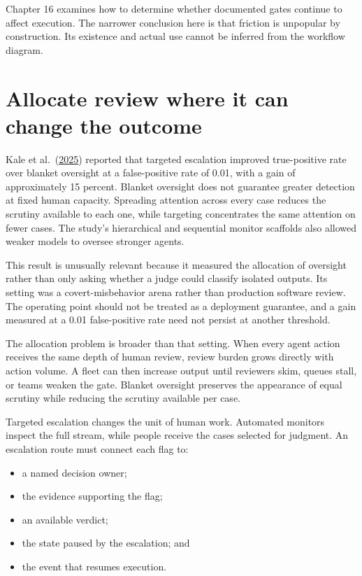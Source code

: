 Chapter 16 examines how to determine whether documented gates continue to affect execution. The narrower conclusion here is that friction is unpopular by construction. Its existence and actual use cannot be inferred from the workflow diagram.

\section{Allocate review where it can change the outcome}\label{allocate-review-where-it-can-change-the-outcome}

Kale et al.~(\href{https://arxiv.org/abs/2508.19461}{2025}) reported that targeted escalation improved true-positive rate over blanket oversight at a false-positive rate of 0.01, with a gain of approximately 15 percent. Blanket oversight does not guarantee greater detection at fixed human capacity. Spreading attention across every case reduces the scrutiny available to each one, while targeting concentrates the same attention on fewer cases. The study's hierarchical and sequential monitor scaffolds also allowed weaker models to oversee stronger agents.

This result is unusually relevant because it measured the allocation of oversight rather than only asking whether a judge could classify isolated outputs. Its setting was a covert-misbehavior arena rather than production software review. The operating point should not be treated as a deployment guarantee, and a gain measured at a 0.01 false-positive rate need not persist at another threshold.

The allocation problem is broader than that setting. When every agent action receives the same depth of human review, review burden grows directly with action volume. A fleet can then increase output until reviewers skim, queues stall, or teams weaken the gate. Blanket oversight preserves the appearance of equal scrutiny while reducing the scrutiny available per case.

Targeted escalation changes the unit of human work. Automated monitors inspect the full stream, while people receive the cases selected for judgment. An escalation route must connect each flag to:

\begin{itemize}
\tightlist
\item
  a named decision owner;
\item
  the evidence supporting the flag;
\item
  an available verdict;
\item
  the state paused by the escalation; and
\item
  the event that resumes execution.
\end{itemize}

